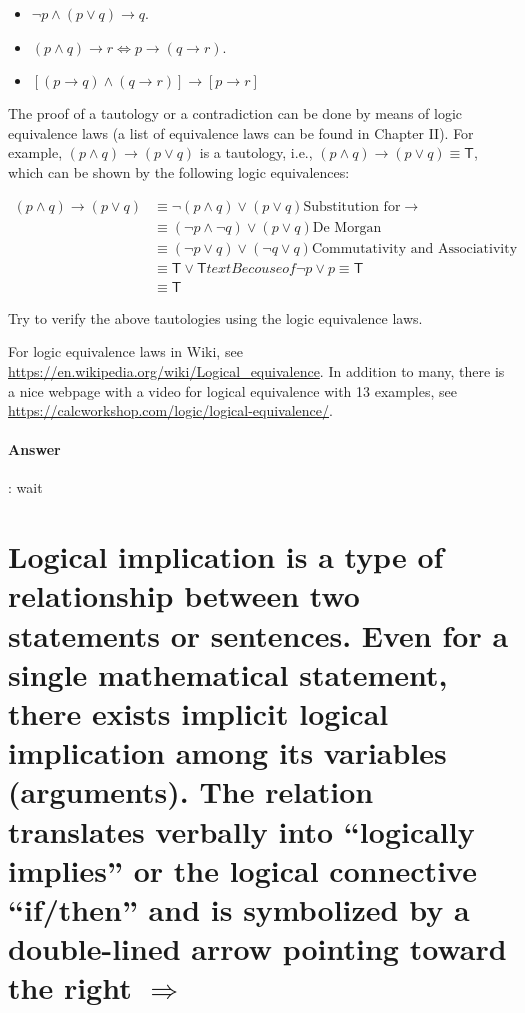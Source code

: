 \documentclass{article}
\begin{document}
\begin{itemize}
  \item $\lnot p \land (p \lor q) \to q$.
  \item $(p \land q) \to r \Leftrightarrow p \to (q \to r) $.
  \item $[(p \to q) \land (q \to r)] \to [p \to r]$
\end{itemize}

The proof of a tautology or a contradiction can be done by means of logic equivalence laws (a list of equivalence laws can be found in Chapter II). For example, $(p \land q) \to (p \lor q)$ is a tautology, i.e., $(p \land q) \to (p \lor q) \equiv \mathsf{T} $, which can be shown by the following logic equivalences:

\begin{equation*}
  \begin{aligned}
    (p \land q) \to (p \lor q) & \equiv \lnot (p \land q) \lor (p \lor q) \text{Substitution for} \to \\
    & \equiv (\lnot p \land \lnot q) \lor (p \lor q) \text{De Morgan} \\
    & \equiv (\lnot p \lor q) \lor (\lnot q \lor q) \text{Commutativity and Associativity} \\
    & \equiv \mathsf{T} \lor \mathsf{T} text{Becouse of} \lnot p \lor p \equiv \mathsf{T} \\
    & \equiv \mathsf{T}
  \end{aligned}
\end{equation*}

Try to verify the above tautologies using the logic equivalence laws.

\begin{tcolorbox}
  For logic equivalence laws in Wiki, see \url{https://en.wikipedia.org/wiki/Logical_equivalence}. In addition to many, there is a nice webpage with a video for logical equivalence with 13 examples, see \url{https://calcworkshop.com/logic/logical-equivalence/}.
\end{tcolorbox}

\paragraph{Answer}:
wait


\section{Logical implication is a type of relationship between two statements or sentences. Even for a single mathematical statement, there exists implicit logical implication among its variables (arguments). The relation translates verbally into “logically implies” or the logical connective “if/then” and is symbolized by a double-lined arrow pointing toward the right $\Longrightarrow $}
\end{document}
